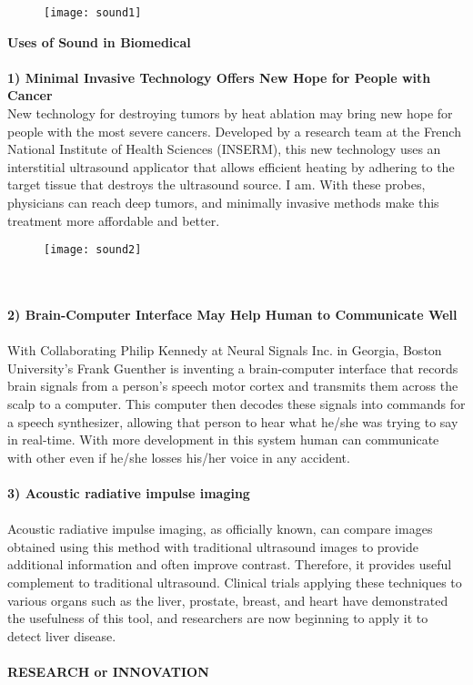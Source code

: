 \documentclass[12pt]{article}
\begin{document}
\begin{large}
\begin{large}
\begin{figure}[h]
\centering
\texttt{[image: sound1]}
\end{figure}



\end{large}
\clearpage
{\LARGE \textbf{Uses of Sound in Biomedical }}\\
\\
{\large \textbf{1) Minimal Invasive Technology Offers New Hope for People with Cancer} }\\

 {\large New technology for destroying tumors by heat ablation may bring new hope for people with the most severe cancers. Developed by a research team at the French National Institute of Health Sciences (INSERM), this new technology uses an interstitial ultrasound applicator that allows efficient heating by adhering to the target tissue that destroys the ultrasound source. I am. With these probes, physicians can reach deep tumors, and  minimally invasive methods make this treatment  more affordable and better.}\\
 \begin{figure}[h]
\centering
\texttt{[image: sound2]}
\end{figure}
 \\
 \\
 {\large \textbf{2) Brain-Computer Interface May Help Human to Communicate Well}}\\
 \\
 {\large  With Collaborating Philip Kennedy at Neural Signals Inc. in Georgia, Boston University's Frank Guenther is inventing a brain-computer interface that records brain signals from a person's speech motor cortex and transmits them across the scalp to a computer. This computer then decodes these signals into commands for a speech synthesizer, allowing that person to hear what he/she was trying to say in real-time. With more development in this system human can communicate with other even if he/she losses his/her voice in any accident.}\\
 \\

{\large \textbf{3) Acoustic radiative impulse imaging}}\\
\\
{\large Acoustic radiative impulse imaging, as officially known, can compare images obtained using this method with traditional ultrasound images to provide additional information and often improve contrast. Therefore, it provides useful complement to traditional ultrasound. Clinical trials applying these techniques to various organs such as the liver, prostate, breast, and heart have demonstrated the usefulness of this tool, and researchers are now beginning to apply it to detect liver disease.} \\
\\
\clearpage
{\Large \textbf{RESEARCH or INNOVATION}}\\


\end{large}
\end{document}

